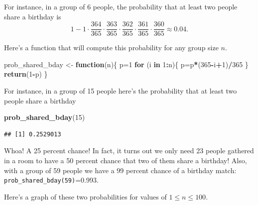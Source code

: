 \documentclass[
]{book}
\newenvironment{Shaded}{\begin{snugshade}}{\end{snugshade}}
\newcommand{\ControlFlowTok}[1]{\textcolor[rgb]{0.13,0.29,0.53}{\textbf{#1}}}
\newcommand{\DecValTok}[1]{\textcolor[rgb]{0.00,0.00,0.81}{#1}}
\newcommand{\FunctionTok}[1]{\textcolor[rgb]{0.13,0.29,0.53}{\textbf{#1}}}
\newcommand{\NormalTok}[1]{#1}
\newcommand{\OtherTok}[1]{\textcolor[rgb]{0.56,0.35,0.01}{#1}}
\newcommand{\SpecialCharTok}[1]{\textcolor[rgb]{0.81,0.36,0.00}{\textbf{#1}}}
\theoremstyle{definition}
\theoremstyle{definition}
\theoremstyle{definition}
\theoremstyle{definition}
\theoremstyle{remark}
\begin{document}
For instance, in a group of 6 people, the probability that at least two people share a birthday is \[1-1 \cdot \frac{364}{365}\cdot\frac{363}{365}\cdot \frac{362}{365}\cdot\frac{361}{365}\cdot\frac{360}{365}\approx0.04.\]

Here's a function that will compute this probability for any group size \(n\).

\begin{Shaded}
\begin{Highlighting}[]
\NormalTok{prob\_shared\_bday }\OtherTok{\textless{}{-}} \ControlFlowTok{function}\NormalTok{(n)\{}
\NormalTok{  p}\OtherTok{=}\DecValTok{1}
  \ControlFlowTok{for}\NormalTok{ (i }\ControlFlowTok{in} \DecValTok{1}\SpecialCharTok{:}\NormalTok{n)\{}
\NormalTok{    p}\OtherTok{=}\NormalTok{p}\SpecialCharTok{*}\NormalTok{(}\DecValTok{365}\SpecialCharTok{{-}}\NormalTok{i}\SpecialCharTok{+}\DecValTok{1}\NormalTok{)}\SpecialCharTok{/}\DecValTok{365}
\NormalTok{    \}}
  \FunctionTok{return}\NormalTok{(}\DecValTok{1}\SpecialCharTok{{-}}\NormalTok{p)}
\NormalTok{\}}
\end{Highlighting}
\end{Shaded}

For instance, in a group of 15 people here's the probability that at least two people share a birthday

\begin{Shaded}
\begin{Highlighting}[]
\FunctionTok{prob\_shared\_bday}\NormalTok{(}\DecValTok{15}\NormalTok{)}
\end{Highlighting}
\end{Shaded}

\begin{verbatim}
## [1] 0.2529013
\end{verbatim}

Whoa! A 25 percent chance! In fact, it turns out we only need 23 people gathered in a room to have a 50 percent chance that two of them share a birthday! Also, with a group of 59 people we have a 99 percent chance of a birthday match: \texttt{prob\_shared\_bday(59)}=0.993.

Here's a graph of these two probabilities for values of \(1 \leq n \leq 100\).
\end{document}
